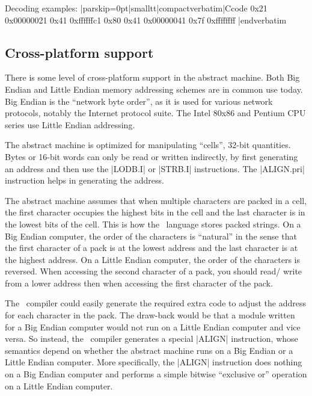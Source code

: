 Decoding examples:
\listingx\verbatim|parskip=0pt|smalltt|compactverbatim|Ccode
0x21              0x00000021
0x41              0xffffffc1
0x80 0x41         0x00000041
0x7f              0xffffffff
|endverbatim\endlistingx


\subsection{Cross-platform support}
  
There is some level of cross-platform support in the abstract machine. Both
Big Endian and Little Endian memory addressing schemes are in common use
today. Big Endian is the ``network byte order'', as it is used for various
network protocols, notably the Internet protocol suite. The Intel 80x86 and
Pentium CPU series use Little Endian addressing.

The abstract machine is optimized for manipulating ``cells'', 32-bit
quantities. Bytes or 16-bit words can only be read or written indirectly, by
first generating an address and then use the |LODB.I| or |STRB.I|
instructions. The |ALIGN.pri| instruction helps in generating the address.

The abstract machine assumes that when multiple characters are packed in a
cell, the first character occupies the highest bits in the cell and the last
character is in the lowest bits of the cell. %
This is how the \Small\ language stores packed strings. On a Big Endian computer,
the order of the characters is ``natural'' in the sense that the first
character of a pack is at the lowest address and the last character is at the
highest address. On a Little Endian computer, the order of the characters is
reversed. When accessing the second character of a pack, you should read\slash
write from a lower address then when accessing the first character of the
pack.

The \Small\ compiler could easily generate the required extra code to adjust
the address for each character in the pack. The draw-back would be that a
module written for a Big Endian computer would not run on a Little Endian
computer and vice versa. So instead, the \Small\ compiler generates a special
|ALIGN| instruction, whose semantics depend on whether the abstract machine
runs on a Big Endian or a Little Endian computer. More specifically, the
|ALIGN| instruction does nothing on a Big Endian computer and performs a
simple bitwise ``exclusive or'' operation on a Little Endian computer.

